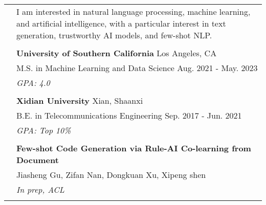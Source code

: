 \documentclass[letterpaper, 10pt]{article}
\begin{document}
\begin{longtable}{p{1.3in}p{4.8in}}



\nohyphens{\color{black}{Research Interests}}
& I am interested in natural language processing, machine learning, and artificial intelligence, with a particular interest in text generation, trustworthy AI models, and few-shot NLP. \\
& \\




\color{black}{Education} & \textbf{University of Southern California} \hfill Los Angeles, CA \\
& M.S. in Machine Learning and Data Science \hfill Aug. 2021 - May. 2023\\
& {\it GPA: 4.0}\\
& \\

& \textbf{Xidian University} \hfill Xian, Shaanxi\\
& B.E. in Telecommunications Engineering \hfill Sep. 2017 - Jun. 2021 \\
& {\it GPA: Top 10\%}\\
& \\



\nohyphens{\color{black}{Publications}}
& \textbf{Few-shot Code Generation via Rule-AI Co-learning from Document\label{few-shot_code}}  \\
& Jiasheng Gu, Zifan Nan, Dongkuan Xu, Xipeng shen \\
& \textit{In prep, ACL}\\
& \\



\end{longtable}
\end{document}
